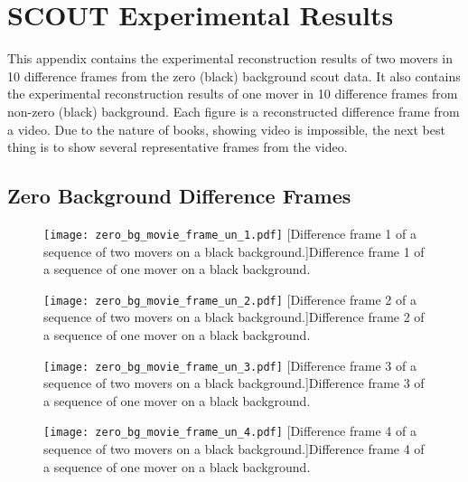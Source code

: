 \chapter{SCOUT Experimental Results}\label{app:scoutExpResults}

This appendix contains the experimental reconstruction results of two movers in 10 difference frames from the zero (black) background \gls{scout} data. It also contains the experimental reconstruction results of one mover in 10 difference frames from non-zero (black) background. Each figure is a reconstructed difference frame from a video. Due to the nature of books, showing video is impossible, the next best thing is to show several representative frames from the video.


\section{Zero Background Difference Frames}

\begin{figure}[!ht]
	\centering
	\texttt{[image: zero\_bg\_movie\_frame\_un\_1.pdf]}
	[Difference frame 1 of a sequence of two movers on a black background.]{Difference frame 1 of a sequence of one mover on a black background.}
	\label{fig:zero_bg_movie_frame_un_1}
\end{figure}

\begin{figure}[!ht]
	\centering
	\texttt{[image: zero\_bg\_movie\_frame\_un\_2.pdf]}
	[Difference frame 2 of a sequence of two movers on a black background.]{Difference frame 2 of a sequence of one mover on a black background.}
	\label{fig:zero_bg_movie_frame_un_2}
\end{figure}

\clearpage

\begin{figure}[!ht]
	\centering
	\texttt{[image: zero\_bg\_movie\_frame\_un\_3.pdf]}
	[Difference frame 3 of a sequence of two movers on a black background.]{Difference frame 3 of a sequence of one mover on a black background.}
	\label{fig:zero_bg_movie_frame_un_3}
\end{figure}

\begin{figure}[!ht]
	\centering
	\texttt{[image: zero\_bg\_movie\_frame\_un\_4.pdf]}
	[Difference frame 4 of a sequence of two movers on a black background.]{Difference frame 4 of a sequence of one mover on a black background.}
	\label{fig:zero_bg_movie_frame_un_4}
\end{figure}

